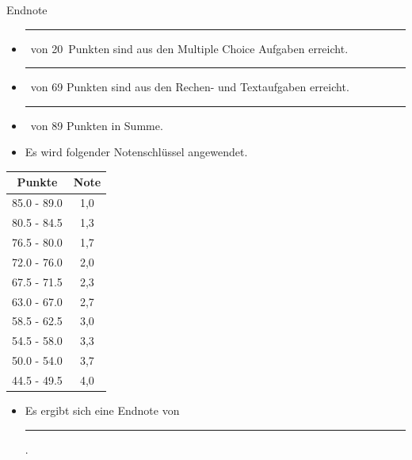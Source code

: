 \documentclass[a4paper, 9pt]{scrartcl}\usepackage[]{graphicx}\usepackage[]{xcolor}
\begin{document}
\begin{graybox}{Endnote}
  \vspace{1Ex}
  \begin{itemize}
  \item[] \rule[0ex]{3em}{.4pt}\, von 20\, Punkten sind aus den Multiple
    Choice Aufgaben erreicht.
  \item[] \rule[0ex]{3em}{.4pt}\, von 69 Punkten sind aus den Rechen- und
    Textaufgaben erreicht. 
  \item[] \rule[0ex]{3em}{.4pt}\, von 89 Punkten in Summe.
  \item[] Es wird folgender Notenschlüssel angewendet.   
  \end{itemize}
  \vspace{1ex}
\begin{center}
  \begin{tabular}[c]{cc}
    \toprule
    \textbf{Punkte}	&	\textbf{Note}	\\
    \midrule
    85.0 - 89.0	&	1,0	\\
    80.5 - 84.5	&	1,3	\\
    76.5 - 80.0	&	1,7	\\
    72.0 - 76.0	&	2,0	\\
    67.5 - 71.5	&	2,3	\\
    63.0 - 67.0	&	2,7	\\
    58.5 - 62.5	&	3,0	\\
    54.5 - 58.0	&	3,3	\\
    50.0 - 54.0	&	3,7	\\
    44.5 - 49.5	&	4,0	\\
    \bottomrule
  \end{tabular}
\end{center}
  \vspace{1ex}
\begin{itemize}
\item[] Es ergibt sich eine Endnote von \rule[0ex]{4em}{.4pt}.
\end{itemize}
  \vspace{1Ex}
\end{graybox}

\newpage
\end{document}
